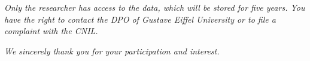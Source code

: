 \textsl{Only the researcher has access to the data, which will be stored for five years. You have the right to contact the \acrfull{DPO} of Gustave Eiffel University or to file a complaint with the \acrfull{CNIL}.}%

\textsl{We sincerely thank you for your participation and interest.}%

